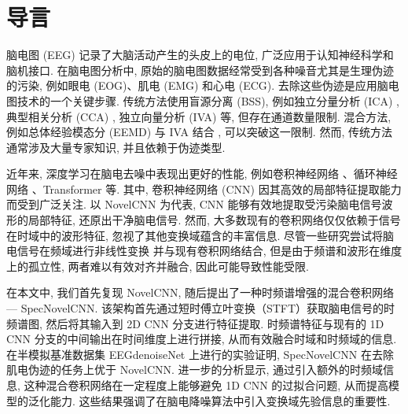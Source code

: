 \documentclass[12pt,a4paper]{article}
\begin{document}
\titleformat{\section}{\Large\fangsong}{\thesection}{1em}{}
\titleformat{\subsection}{\large\fangsong}{\thesubsection}{1em}{}
\titleformat{\subsubsection}{\fangsong}{\thesubsubsection}{1em}{}

\section{导言}

脑电图 (EEG) 记录了大脑活动产生的头皮上的电位, 广泛应用于认知神经科学和脑机接口. 在脑电图分析中, 原始的脑电图数据经常受到各种噪音尤其是生理伪迹的污染, 例如眼电 (EOG)、肌电 (EMG) 和心电 (ECG). 去除这些伪迹是应用脑电图技术的一个关键步骤. 传统方法使用盲源分离 (BSS), 例如独立分量分析 (ICA) \cite{jung_removing_2000}, 典型相关分析 (CCA) \cite{de_clercq_canonical_2006}, 独立向量分析 (IVA) \cite{liu_state-dependent_2021} 等, 但存在通道数量限制. 混合方法, 例如总体经验模态分 (EEMD) 与 IVA 结合 \cite{sweeney_use_2013}, 可以突破这一限制. 然而, 传统方法通常涉及大量专家知识, 并且依赖于伪迹类型.

近年来, 深度学习在脑电去噪中表现出更好的性能, 例如卷积神经网络 \cite{sun_novel_2020,zhang_novel_2021}、循环神经网络 \cite{zhang_eegdenoisenet_2021,zhang_two-stage_2022}、Transformer \cite{yin_gan_2023} 等. 其中, 卷积神经网络 (CNN) 因其高效的局部特征提取能力而受到广泛关注. 以 NovelCNN \cite{sun_novel_2020} 为代表, CNN 能够有效地提取受污染脑电信号波形的局部特征, 还原出干净脑电信号. 然而, 大多数现有的卷积网络仅仅依赖于信号在时域中的波形特征, 忽视了其他变换域蕴含的丰富信息. 尽管一些研究尝试将脑电信号在频域进行非线性变换 \cite{yin_frequency_2022} 并与现有卷积网络结合, 但是由于频谱和波形在维度上的孤立性, 两者难以有效对齐并融合, 因此可能导致性能受限.

在本文中, 我们首先复现 NovelCNN, 随后提出了一种时频谱增强的混合卷积网络 — SpecNovelCNN. 该架构首先通过短时傅立叶变换（STFT）获取脑电信号的时频谱图, 然后将其输入到 2D CNN 分支进行特征提取. 时频谱特征与现有的 1D CNN 分支的中间输出在时间维度上进行拼接, 从而有效融合时域和时频域的信息. 在半模拟基准数据集 EEGdenoiseNet 上进行的实验证明, SpecNovelCNN 在去除肌电伪迹的任务上优于 NovelCNN. 进一步的分析显示, 通过引入额外的时频域信息, 这种混合卷积网络在一定程度上能够避免 1D CNN 的过拟合问题, 从而提高模型的泛化能力. 这些结果强调了在脑电降噪算法中引入变换域先验信息的重要性.
\end{document}
